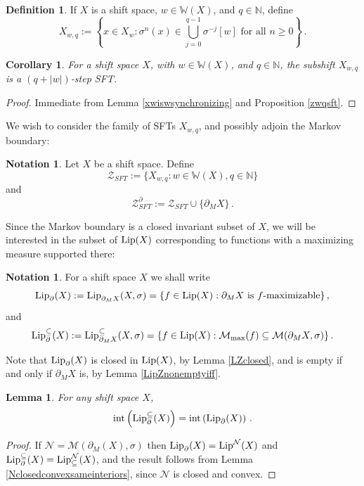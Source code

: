 \documentclass[reqno,11pt]{amsart}
\newtheorem{lem}[thm]{Lemma}
\newtheorem{cor}[thm]{Corollary}
\theoremstyle{definition}
\newtheorem{defn}[thm]{Definition}
\newtheorem{notation}[thm]{Notation}
\theoremstyle{remark}
\theoremstyle{remark}
\def \N {\mathbb N}
\def\m{\mathcal M}
\def\n{\mathcal N}
\def\lip{{\rm Lip}}
\def\w{\mathbb{W}}
\def\ZZ{\mathcal{Z}}
\numberwithin{equation}{section}
\begin{document}
\begin{defn}
If $X$ is a shift space, $w\in \w(X)$, and $q\in\N$, define
\begin{equation}\label{xwq}
X_{w,q}:=\left\{ x\in X_{w} : \sigma^n(x)\in \bigcup_{j=0}^{q-1} \sigma^{-j}[w]\text{ for all }n\ge0\right\}\,.
\end{equation}
\end{defn}

\begin{cor}
For a shift space $X$, with $w\in\w(X)$, and $q\in\N$, the subshift $X_{w,q}$ is a $(q+|w|)$-step SFT.
\end{cor}
\begin{proof}
Immediate from Lemma \ref{xwiswsynchronizing}
and
Proposition \ref{zwqsft}.
\end{proof}

We wish to consider the family of SFTs $X_{w,q}$, and possibly adjoin the Markov boundary: 

\begin{notation}
Let $X$ be a shift space.
Define
$$\ZZ_{SFT}:=\{X_{w,q}:w\in\w(X), q\in\N\}$$
and
$$\ZZ_{SFT}^\partial:= \ZZ_{SFT} \cup \{\partial_MX\}\,.$$
\end{notation}


Since the Markov boundary is a closed invariant subset of $X$, we will be interested in the subset of $\lip(X)$
corresponding to functions with a maximizing measure supported there:

\begin{notation} For  a shift space $X$ we shall write
$$\lip_{\partial}(X):=
\lip_{\partial_MX}(X,\sigma)
=
\left\{f\in\lip(X): 
\partial_MX\text{ is $f$-maximizable} \right\},$$
and
$$\lip_{\partial}^\subseteq(X):=
\lip_{\partial_MX}^\subseteq(X,\sigma)
=
\left\{f\in\lip(X): 
\mathcal{M}_{\max}(f)\subseteq \mathcal{M}(\partial_MX,\sigma) \right\}.$$
\end{notation}

Note that $\lip_{\partial}(X)$ is closed in $\lip(X)$, by Lemma \ref{LZclosed},
and is empty if and only if  $\partial_MX$ is, by Lemma \ref{LipZnonemptyiff}.

\begin{lem}\label{l-3}
For any shift space $X$,
$$\text{int}\left(\lip^\subseteq_{\partial}(X)\right) = \text{int}\left(\lip_{\partial}(X)\right)\,.$$
	\end{lem}
\begin{proof}
If $\n=\m(\partial_M(X),\sigma)$
then
 $\lip_\partial(X)=\lip^\n(X)$ and
$\lip_\partial^\subseteq(X)=\lip^\n_\subseteq(X)$,
and the result follows from Lemma \ref{Nclosedconvexsameinteriors},
since $\n$ is closed and convex.
\end{proof}
\end{document}
